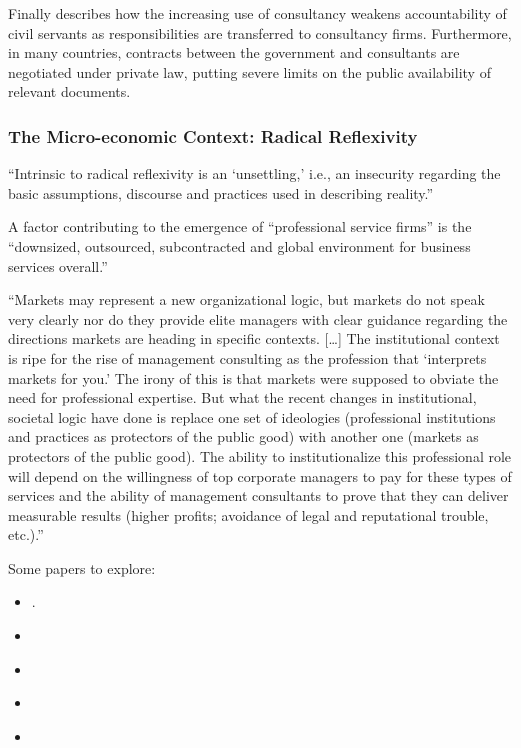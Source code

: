 \documentclass[12pt]{article}
\providecommand{\tightlist}{%
  \setlength{\itemsep}{0pt}\setlength{\parskip}{0pt}}
\begin{document}
Finally \citet[252]{ylonen2019} describes how the increasing use of
consultancy weakens accountability of civil servants as responsibilities
are transferred to consultancy firms. Furthermore, in many countries,
contracts between the government and consultants are negotiated under
private law, putting severe limits on the public availability of
relevant documents.

\hypertarget{the-micro-economic-context-radical-reflexivity}{%
\subsubsection{The Micro-economic Context: Radical
Reflexivity}\label{the-micro-economic-context-radical-reflexivity}}

``Intrinsic to radical reflexivity is an `unsettling,' i.e., an
insecurity regarding the basic assumptions, discourse and practices used
in describing reality.'' \citep[ 370]{pollner1991}

A factor contributing to the emergence of ``professional service firms''
is the ``downsized, outsourced, subcontracted and global environment for
business services overall.'' \citep[ 17]{leicht2006}

``Markets may represent a new organizational logic, but markets do not
speak very clearly nor do they provide elite managers with clear
guidance regarding the directions markets are heading in specific
contexts. {[}\ldots{]} The institutional context is ripe for the rise of
management consulting as the profession that `interprets markets for
you.' The irony of this is that markets were supposed to obviate the
need for professional expertise. But what the recent changes in
institutional, societal logic have done is replace one set of ideologies
(professional institutions and practices as protectors of the public
good) with another one (markets as protectors of the public good). The
ability to institutionalize this professional role will depend on the
willingness of top corporate managers to pay for these types of services
and the ability of management consultants to prove that they can deliver
measurable results (higher profits; avoidance of legal and reputational
trouble, etc.).'' \citep[ 37]{leicht2006}

Some papers to explore:

\begin{itemize}
\tightlist
\item
  \citep[ 120-130]{armbruster2006}.
\item
  \citep{kipping2003}
\item
  \citep{kipping2012}
\item
  \citep[ 336]{fincham1999}
\item
  \citep{mckenna2006}
\end{itemize}
\end{document}
